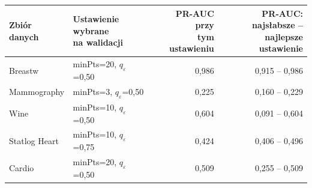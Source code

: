 \begin{tabular}{llrr}
\toprule
Zbiór danych & \makecell[l]{Ustawienie wybrane\\na walidacji} & \makecell[r]{PR-AUC przy\\tym ustawieniu} & \makecell[r]{PR-AUC: najsłabsze --\\najlepsze ustawienie} \\
\midrule
Breastw & minPts=20, $q_\varepsilon$=0,50 & 0,986 & 0,915 -- 0,986 \\
Mammography & minPts=3, $q_\varepsilon$=0,50 & 0,225 & 0,160 -- 0,229 \\
Wine & minPts=10, $q_\varepsilon$=0,50 & 0,604 & 0,091 -- 0,604 \\
Statlog Heart & minPts=10, $q_\varepsilon$=0,75 & 0,424 & 0,406 -- 0,496 \\
Cardio & minPts=20, $q_\varepsilon$=0,50 & 0,509 & 0,255 -- 0,509 \\
\bottomrule
\end{tabular}
